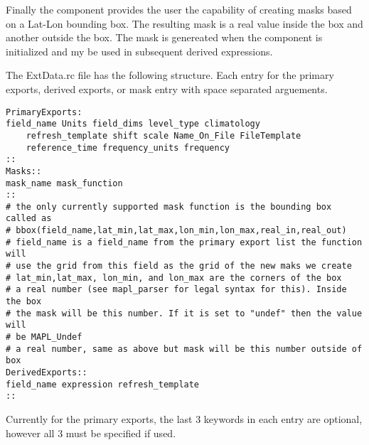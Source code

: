 Finally the component provides the user the capability of creating masks based on a Lat-Lon bounding box.
The resulting mask is a real value inside the box and another outside the box. The mask is genereated
when the component is initialized and my be used in subsequent derived expressions.

The ExtData.rc file has the following structure. Each entry for the primary exports, derived exports, or mask entry with space separated arguements.
\begin{verbatim}
PrimaryExports:
field_name Units field_dims level_type climatology 
    refresh_template shift scale Name_On_File FileTemplate
    reference_time frequency_units frequency
::
Masks::
mask_name mask_function
::
# the only currently supported mask function is the bounding box called as
# bbox(field_name,lat_min,lat_max,lon_min,lon_max,real_in,real_out)
# field_name is a field_name from the primary export list the function will
# use the grid from this field as the grid of the new maks we create
# lat_min,lat_max, lon_min, and lon_max are the corners of the box
# a real number (see mapl_parser for legal syntax for this). Inside the box
# the mask will be this number. If it is set to "undef" then the value will
# be MAPL_Undef
# a real number, same as above but mask will be this number outside of box
DerivedExports::
field_name expression refresh_template
::
\end{verbatim}

Currently for the primary exports, the last 3 keywords in each entry are optional, however all 3 must be specified if used.

